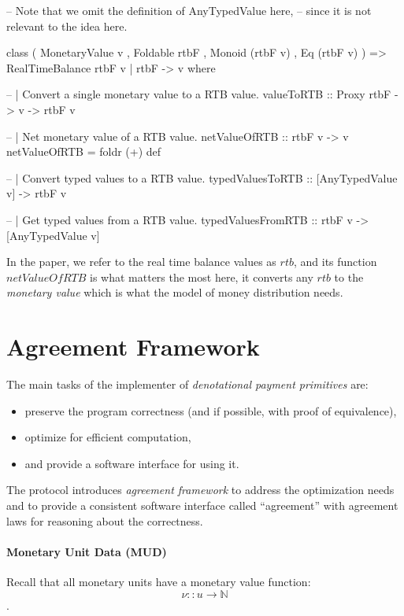 \begin{code}
-- Note that we omit the definition of AnyTypedValue here,
-- since it is not relevant to the idea here.

class ( MonetaryValue v
      , Foldable rtbF
      , Monoid (rtbF v)
      , Eq (rtbF v)
      ) => RealTimeBalance rtbF v | rtbF -> v where

    -- | Convert a single monetary value to a RTB value.
    valueToRTB :: Proxy rtbF -> v -> rtbF v

    -- | Net monetary value of a RTB value.
    netValueOfRTB :: rtbF v -> v
    netValueOfRTB = foldr (+) def

    -- | Convert typed values to a RTB value.
    typedValuesToRTB :: [AnyTypedValue v] -> rtbF v

    -- | Get typed values from a RTB value.
    typedValuesFromRTB :: rtbF v -> [AnyTypedValue v]
\end{code}

In the paper, we refer to the real time balance values as $rtb$, and its function $netValueOfRTB$ is
what matters the most here, it converts any $rtb$ to the \textit{monetary value} which is what the
model of money distribution needs.

\section{Agreement Framework}

The main tasks of the implementer of \textit{denotational payment primitives} are:

\begin{itemize}
    \item preserve the program correctness (and if possible, with proof of equivalence),
    \item optimize for efficient computation,
    \item and provide a software interface for using it.
\end{itemize}

The protocol introduces \textit{agreement framework} to address the optimization needs and to
provide a consistent software interface called ``agreement'' with agreement laws for reasoning about
the correctness.

\paragraph{Monetary Unit Data (MUD)}

Recall that all monetary units have a monetary value function: $$ \nu :: u \rightarrow \mathbb{N}$$.

